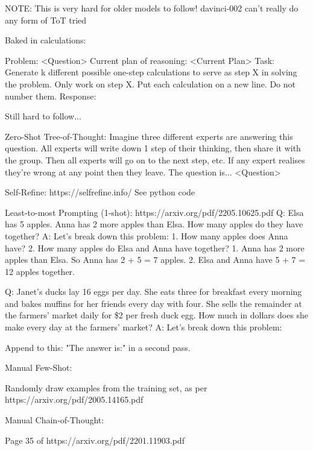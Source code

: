 \documentclass[11pt]{article}
\begin{document}
NOTE: This is very hard for older models to follow! davinci-002 can't really do any form of ToT tried

Baked in calculations:

Problem:
<Question> 
Current plan of reasoning:
<Current Plan>
Task:
Generate {k} different possible one-step calculations to serve as step {X} in solving the problem. Only work on step {X}. Put each calculation on a new line. Do not number them.
Response:

Still hard to follow...

Zero-Shot Tree-of-Thought:
Imagine three different experts are answering this question.
All experts will write down 1 step of their thinking,
then share it with the group.
Then all experts will go on to the next step, etc.
If any expert realises they're wrong at any point then they leave.
The question is...
<Question>

Self-Refine: https://selfrefine.info/
See python code

Least-to-most Prompting (1-shot): https://arxiv.org/pdf/2205.10625.pdf
Q: Elsa has 5 apples. Anna has 2 more apples than Elsa. How many apples do they have together?
A: Let's break down this problem: 1. How many apples does Anna have? 2. How many apples do Elsa and Anna have together?
1. Anna has 2 more apples than Elsa. So Anna has 2 + 5 = 7 apples.
2. Elsa and Anna have 5 + 7 = 12 apples together.

Q: Janet's ducks lay 16 eggs per day. She eats three for breakfast every morning and bakes muffins for her friends every day with four. She sells the remainder at the farmers' market daily for \$2 per fresh duck egg. How much in dollars does she make every day at the farmers' market?
A: Let's break down this problem:

Append to this: "The answer is:" in a second pass.

Manual Few-Shot:

Randomly draw examples from the training set, as per https://arxiv.org/pdf/2005.14165.pdf

Manual Chain-of-Thought:

Page 35 of https://arxiv.org/pdf/2201.11903.pdf
\end{document}
